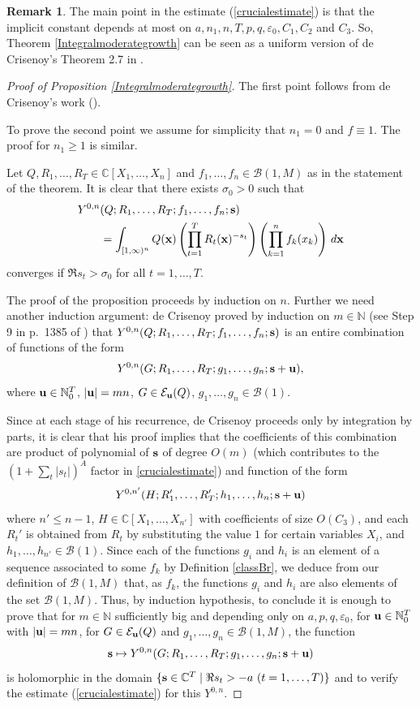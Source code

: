 \documentclass[a4paper,12pt]{article}
\theoremstyle{definition}
\newtheorem{rem}[thm]{Remark}
\numberwithin{equation}{section}
\def\N{{\mathbb N}}
\def\C{{\mathbb C}}
\def\s{{\bf s}}
\def\x{{\bf x}}
\def\u{{\bf u}}
\newcommand{\dd}{d}
\def\eps{{\varepsilon}}
\begin{document}
\begin{rem}
The main point in the estimate (\ref{crucialestimate}) is that the implicit constant depends at most on $a,n_1,n, T, p, q, \eps_0, C_1, C_2$ and $C_3$. So, Theorem \ref{Integralmoderategrowth} can be seen as a uniform version of de Crisenoy's Theorem 2.7 in \cite{dC}.
\end{rem}

\begin{proof}[Proof of Proposition \ref{Integralmoderategrowth}]
The first point follows from de Crisenoy's work (\cite[Theorem 2.7]{dC}).

To prove the second point we assume for simplicity that $n_1=0$ and $f\equiv 1$. The proof for $n_1 \geq 1$ is similar.

Let $Q, R_1,\ldots, R_T\in \C[X_1,\ldots, X_n]$ and $f_1,\ldots, f_n \in \mathcal B(1, M)$ as in the statement of the theorem.  It is clear that there exists $\sigma_0>0$ such that
\begin{align*}
&Y^{0, n}(Q; R_1,\ldots, R_T; f_1,\ldots,f_n; \s)\\
&\qquad = \int_{ [1,\infty)^n}Q(\x) \left(\prod_{t=1}^T R_t(\x)^{-s_t}\right) 
\left(\prod_{k=1}^n f_k (x_k)\right) \, \dd \x
\end{align*}
converges if $\Re s_t>\sigma_0$ for all $t=1,\ldots, T$.

The proof of the proposition proceeds by induction on $n$.
Further we need another induction argument:
de Crisenoy proved by induction on $m\in \N$ (see Step 9 in p.~1385 of \cite{dC}) that 
$Y^{0, n}(Q; R_1,\ldots, R_T; f_1,\ldots,f_n; \s)$ is an entire combination of functions of the form 
$$Y^{0, n}(G; R_1,\ldots, R_T; g_1,\ldots,g_n; \s+\u),$$ where $\u \in \N_0^T$, $|\u|=m n$, $G\in \mathcal E_{\u}(Q)$, $g_1,\ldots, g_n \in \mathcal B (1)$. 

Since at each stage of his recurrence, de Crisenoy proceeds only by integration by parts, it is clear that his proof implies that the coefficients of this combination are product of polynomial of $\s$ of degree $O(m)$ (which contributes to the 
$(1+\sum_t |s_t|)^A$ factor in \eqref{crucialestimate})
and function of the form 
$$Y^{0, n'}(H; R_1',\ldots, R_T'; h_1,\ldots,h_n; \s+\u)$$ 
where $n'\leq n-1$, $H\in \C[X_1,\ldots,X_{n'}]$ with coefficients of size $O(C_3)$, and each $R_t'$ is obtained from $R_t$ by substituting the value $1$ for certain variables $X_i$, and $h_1,\ldots,h_{n'} \in \mathcal B(1)$.
Since each of the functions $g_i$ and $h_i$ is an element of a sequence associated to some $f_k$ by Definition \ref{classBr}, we deduce from our definition of $\mathcal B(1,M)$ that, as $f_k$, the functions $g_i$ and $h_i$ are also elements of the set 
$\mathcal B(1,M)$.
Thus, by induction hypothesis, to conclude it is enough to prove that for $m\in \N$ sufficiently big and depending only on $a, p, q , \eps_0$, for $\u \in \N_0^T$ with $|\u|=m n$, 
for $G\in \mathcal E_{\u}(Q)$ and $g_1,\ldots, g_n \in \mathcal B (1, M)$, the function 
$$ \s\mapsto Y^{0, n}(G; R_1,\ldots, R_T; g_1,\ldots,g_n; \s+\u) $$ 
is holomorphic in the domain $\{\s \in \C^T\mid \Re s_t>-a~ (t=1,\ldots, T)\}$ and to verify the estimate (\ref{crucialestimate}) for this $Y^{0,n}$.


\end{proof}
\end{document}
